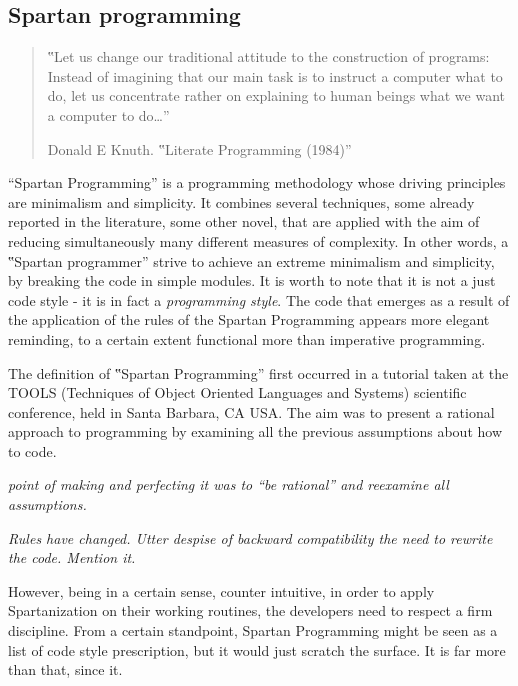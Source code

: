 
\subsection{Spartan programming}

\begin{quote}
  ‟Let us change our traditional attitude to the construction of programs:
  Instead of imagining that our main task is to instruct a computer what to do,
  let us concentrate rather on explaining to human beings what we want a computer
  to do…”
  \begin{flushright}
   \upshape Donald E Knuth. ‟Literate Programming (1984)”
  \end{flushright}
\end{quote}

``Spartan Programming'' is a programming methodology whose driving principles are
minimalism and simplicity. It combines several techniques,
some already reported in the literature, some other novel, that are applied
with the aim of reducing
simultaneously many different measures of complexity.
In other words, a ‟Spartan programmer” strive
to achieve an extreme minimalism and simplicity, by breaking
the code in simple modules.
It is worth to note that it is not a just code style - it is in fact a \emph{programming style}.
The code that emerges as a result of the application of the rules of the
Spartan Programming appears more elegant reminding, to a certain extent
functional more than imperative programming.


The definition of ‟Spartan Programming” first occurred in a tutorial taken at
the TOOLS (Techniques of Object Oriented Languages and Systems) scientific conference,
held in Santa Barbara, CA USA.
The aim was to present a rational approach to programming by examining all the previous
assumptions about how to code.

\emph{point of making and perfecting it was to ``be rational'' and
reexamine all assumptions.}

\emph{Rules have changed.
Utter despise of backward compatibility the need to rewrite the code.
Mention it.}


However, being in a certain sense, counter intuitive, in order to apply
Spartanization on their working routines, the developers need to respect a
firm discipline. From a certain standpoint, Spartan Programming might be
seen as a list of code style prescription, but it would just scratch the
surface. It is far more than that, since it.

